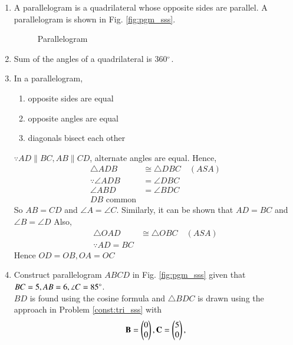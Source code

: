 \renewcommand{\theequation}{\theenumi}
\begin{enumerate}[label=\arabic*.,ref=\thesubsection.\theenumi]
\item A parallelogram is a quadrilateral whose opposite sides are parallel. A parallelogram is shown in Fig. \eqref{fig:pgm_sss}.	

%
\begin{figure}[!ht]
	\begin{center}
		\resizebox{\columnwidth}{!}{}
	\end{center}
	\caption{Parallelogram}
	\label{fig:pgm_sas}	
\end{figure}

\item Sum of the angles of a quadrilateral is 360$\degree$. 
\item  In a parallelogram, 
\label{them:pgm_basic}
\begin{enumerate}
\item opposite sides are equal 
\item  opposite angles are equal
\item  diagonals bisect each other
\end{enumerate}
\solution $\because AD \parallel BC, AB \parallel CD$, alternate angles are equal.  Hence, 
%
\begin{align}
\triangle ADB &\cong \triangle  DBC \quad (ASA)
\\
\because \angle ADB &= \angle DBC
\\
\angle ABD &= \angle BDC
\\
DB \text{ common}
\end{align}
%
So $AB = CD$ and $\angle A = \angle C$.  Similarly, it can be shown that $AD = BC$ and $\angle B = \angle D$
Also, 
%
\begin{align}
\triangle OAD &\cong \triangle  OBC \quad (ASA)
\\
\because AD = BC
\end{align}
%
Hence $OD = OB, OA=OC$
\item Construct parallelogram $ABCD$ 	in Fig. \ref{fig:pgm_sss}	
given that  $BC = 5, AB = 6, \angle C = 85 \degree$.
\\
\solution $BD$ is found using the cosine formula and $\triangle BDC$ is drawn using the approach in Problem \ref{const:tri_sss} with 
%
\begin{align}
\vec{B} = \myvec{0\\0},
\vec{C} = \myvec{5\\0},

\end{align}
\end{enumerate}
